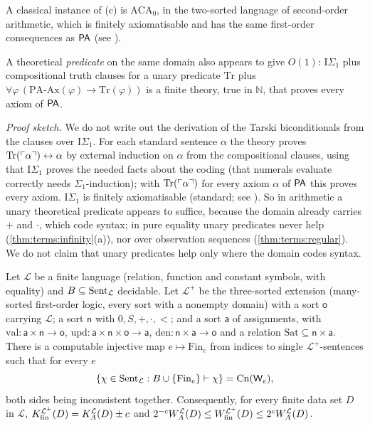 A classical instance of (c) is $\mathrm{ACA}_0$, in the two-sorted language of second-order arithmetic, which is finitely axiomatisable and has the same first-order consequences as $\mathsf{PA}$ (see \citealp{simpson2009subsystems}).

\begin{remark}\label{rem:terms:PAtruth}
A theoretical \emph{predicate} on the same domain also appears to give $O(1)$: $\mathrm I\Sigma_1$ plus compositional truth clauses for a unary predicate $\mathrm{Tr}$ plus $\forall\varphi\,(\mathrm{PA\text{-}Ax}(\varphi)\to\mathrm{Tr}(\varphi))$ is a finite theory, true in $\mathbb N$, that proves every axiom of $\mathsf{PA}$.

\emph{Proof sketch.} We do not write out the derivation of the Tarski biconditionals from the clauses over $\mathrm I\Sigma_1$. For each standard sentence $\alpha$ the theory proves $\mathrm{Tr}(\ulcorner \alpha\urcorner)\leftrightarrow\alpha$ by external induction on $\alpha$ from the compositional clauses, using that $\mathrm I\Sigma_1$ proves the needed facts about the coding (that numerals evaluate correctly needs $\Sigma_1$-induction); with $\mathrm{Tr}(\ulcorner \alpha\urcorner)$ for every axiom $\alpha$ of $\mathsf{PA}$ this proves every axiom. $\mathrm I\Sigma_1$ is finitely axiomatisable (standard; see \citealp{hajek1993metamathematics}). So in arithmetic a unary theoretical predicate appears to suffice, because the domain already carries $+$ and $\cdot$, which code syntax; in pure equality unary predicates never help (\cref{thm:terms:infinity}(a)), nor over observation sequences (\cref{thm:terms:regular}). We do not claim that unary predicates help only where the domain codes syntax.
\end{remark}

\begin{theorem}\label{thm:terms:KCV}
Let $\mathcal L$ be a finite language (relation, function and constant symbols, with equality) and $B\subseteq\mathrm{Sent}_{\mathcal L}$ decidable. Let $\mathcal L^+$ be the three-sorted extension (many-sorted first-order logic, every sort with a nonempty domain) with a sort $\mathsf o$ carrying $\mathcal L$; a sort $\mathsf n$ with $0,S,+,\cdot,<$; and a sort $\mathsf a$ of assignments, with $\mathrm{val}:\mathsf a\times\mathsf n\to\mathsf o$, $\mathrm{upd}:\mathsf a\times\mathsf n\times\mathsf o\to\mathsf a$, $\mathrm{den}:\mathsf n\times\mathsf a\to\mathsf o$ and a relation $\mathrm{Sat}\subseteq\mathsf n\times\mathsf a$. There is a computable injective map $e\mapsto\mathrm{Fin}_e$ from indices to single $\mathcal L^+$-sentences such that for every $e$
\[
\{\chi\in\mathrm{Sent}_{\mathcal L}:B\cup\{\mathrm{Fin}_e\}\vdash\chi\}=\mathrm{Cn}(\mathsf{W}_{e}),
\]
both sides being inconsistent together. Consequently, for every finite data set $D$ in $\mathcal L$, $K_{\mathrm{fin}}^{\mathcal L^+}(D)=K_{A}^{\mathcal L}(D)\pm c$ and $2^{-c}W_{A}^{\mathcal L}(D)\le W_{\mathrm{fin}}^{\mathcal L^+}(D)\le2^cW_{A}^{\mathcal L}(D)$.
\end{theorem}

